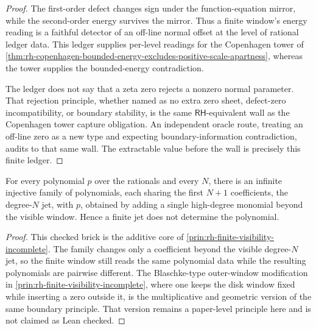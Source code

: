 \begin{proof}
The first-order defect changes sign under the function-equation mirror,
while the second-order energy survives the mirror.  Thus a finite
window's energy reading is a faithful detector of an off-line normal
offset at the level of rational ledger data.  This ledger supplies
per-level readings for the Copenhagen tower of
\autoref{thm:rh-copenhagen-bounded-energy-excludes-positive-scale-apartness},
whereas the tower supplies the bounded-energy contradiction.

The ledger does not say that a zeta zero rejects a nonzero normal
parameter.  That rejection principle, whether named as no extra zero
sheet, defect-zero incompatibility, or boundary stability, is the same
$\mathsf{RH}$-equivalent wall as the Copenhagen tower capture obligation.
An independent oracle route, treating an off-line zero as a new type and
expecting boundary-information contradiction, audits to that same wall.
The extractable value before the wall is precisely this finite ledger.
\end{proof}

\begin{theorem}
\label{thm:rh-finite-visibility-additive-jet-underdetermination}
For every polynomial $p$ over the rationals and every $N$, there is an
infinite injective family of polynomials, each sharing the first $N+1$
coefficients, the degree-$N$ jet, with $p$, obtained by adding a single
high-degree monomial beyond the visible window.  Hence a finite jet does
not determine the polynomial.
\end{theorem}

\begin{proof}
This checked brick is the additive core of
\autoref{prin:rh-finite-visibility-incomplete}.  The family changes only a
coefficient beyond the visible degree-$N$ jet, so the finite window still
reads the same polynomial data while the resulting polynomials are pairwise
different.  The Blaschke-type outer-window modification in
\autoref{prin:rh-finite-visibility-incomplete}, where one keeps the disk
window fixed while inserting a zero outside it, is the multiplicative and
geometric version of the same boundary principle.  That version remains a
paper-level principle here and is not claimed as Lean checked.
\end{proof}

